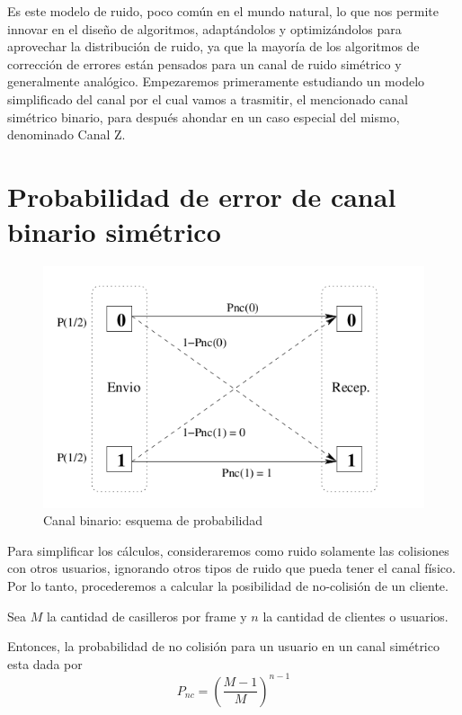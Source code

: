Es este modelo de ruido, poco común en el mundo natural, lo que nos permite innovar en el diseño de algoritmos, adaptándolos y optimizándolos para aprovechar la distribución de ruido, ya que la mayoría de los algoritmos de corrección de errores están pensados para un canal de ruido simétrico y generalmente analógico.
Empezaremos primeramente estudiando un modelo simplificado del canal por el cual vamos a trasmitir, el mencionado canal simétrico binario, para después ahondar en un caso especial del mismo, denominado Canal Z.

\section{Probabilidad de error de canal binario simétrico}

\begin{figure}[t]
  \begin{center}
    \includegraphics[scale=0.60]{graphs/canalBinario.png}
  \end{center}
\caption {Canal binario: esquema de probabilidad}
\label{fig:canbin}
\end{figure}

Para simplificar los cálculos, consideraremos como ruido solamente las colisiones con otros usuarios, ignorando otros tipos de ruido que pueda tener el canal físico. Por lo tanto, procederemos a calcular la posibilidad de no-colisión de un cliente.

Sea $M$ la cantidad de casilleros por frame y $n$ la cantidad de clientes o usuarios.

Entonces, la probabilidad de no colisión para un usuario en un canal simétrico esta dada por
\begin{equation}
P_{nc}=\left(\frac{M-1}{M}\right)^{n-1}
\end{equation}


